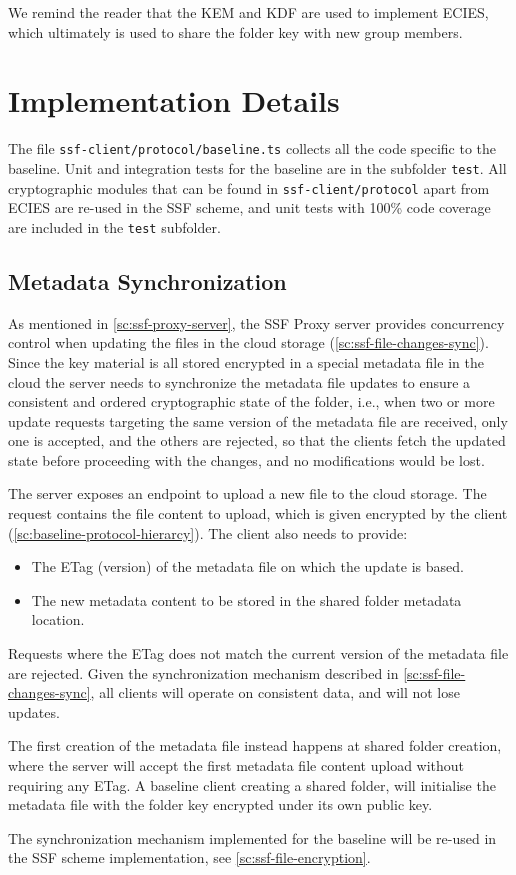 We remind the reader that the KEM and KDF are used to
implement ECIES, which ultimately is used to
share the folder key with new group members.

\section{Implementation Details}\label{sc:baseline-protocol}

The file \texttt{ssf-client/protocol/baseline.ts} collects all the code specific to the baseline.
Unit and integration tests for the baseline are in the subfolder \texttt{test}.
All cryptographic modules that can be found in
\texttt{ssf-client/protocol} apart from ECIES are re-used in the SSF scheme,
and unit tests with 100\% code coverage are included in the
\texttt{test} subfolder.

\subsection{Metadata Synchronization}\label{sc:metadata-synchronization}

As mentioned in \cref{sc:ssf-proxy-server}, the
SSF Proxy server provides concurrency control
when updating the files in the cloud storage (\cref{sc:ssf-file-changes-sync}).
Since the key material is all stored encrypted in a special metadata file
in the cloud
the server needs to synchronize the metadata file updates
to ensure a consistent and ordered cryptographic state of the folder,
i.e., when two or more update requests targeting the same version
of the metadata file are received, only one is
accepted, and the others are rejected, so that the
clients fetch the updated state before proceeding
with the changes, and no modifications would be lost.

The server exposes an endpoint to upload a new file
to the cloud storage. The request contains the file
content to upload, which is given encrypted by the client
(\cref{sc:baseline-protocol-hierarcy}). The client
also needs to provide:
\begin{itemize}
    \item The ETag (version) of the metadata file on which the update is based.
    \item The new metadata content to be stored in the shared folder metadata location.
\end{itemize}
Requests where the ETag does not match the current version
of the metadata file are rejected. Given the
synchronization mechanism described in \cref{sc:ssf-file-changes-sync},
all clients will operate on consistent data, and
will not lose updates.

The first creation of the metadata file instead happens
at shared folder creation, where the server will
accept the first metadata file content upload
without requiring any ETag. A baseline client
creating a shared folder, will initialise the metadata
file with the folder key encrypted under its own
public key.

The synchronization mechanism implemented
for the baseline will be re-used in the SSF scheme
implementation, see \cref{sc:ssf-file-encryption}.
